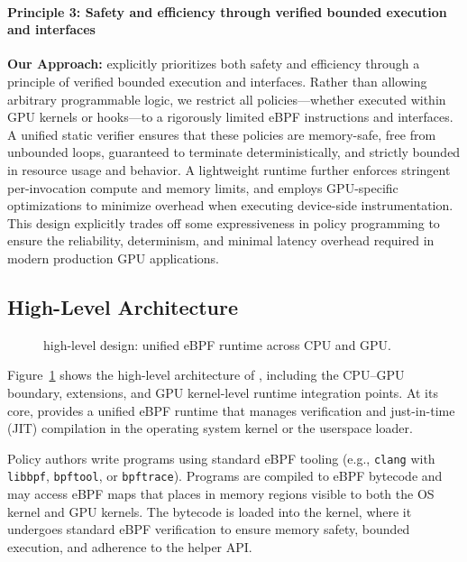 \paragraph{Principle 3: Safety and efficiency through verified bounded execution and interfaces}
\noindent\textbf{Our Approach:} \sys explicitly prioritizes both safety and efficiency through a principle of verified bounded execution and interfaces. Rather than allowing arbitrary programmable logic, we restrict all policies—whether executed within GPU kernels or \sysdriver hooks—to a rigorously limited eBPF instructions and interfaces. A unified static verifier ensures that these policies are memory-safe, free from unbounded loops, guaranteed to terminate deterministically, and strictly bounded in resource usage and behavior. A lightweight runtime further enforces stringent per-invocation compute and memory limits, and employs GPU-specific optimizations to minimize overhead when executing device-side instrumentation. This design explicitly trades off some expressiveness in policy programming to ensure the reliability, determinism, and minimal latency overhead required in modern production GPU applications.

\subsection{High-Level Architecture}
\label{sec:arch}

\begin{figure}
\centering
{}
\vspace{-.5ex}
\caption{\sys high-level design: unified eBPF runtime across CPU and GPU.}
\label{fig:system-design}
\end{figure}

Figure~\ref{fig:system-design} shows the high-level architecture of \sys, including the CPU--GPU boundary, \sysdriver extensions, and GPU kernel-level runtime integration points. At its core, \sys provides a unified eBPF runtime that manages verification and just-in-time (JIT) compilation in the operating system kernel or the userspace loader.

Policy authors write \sys programs using standard eBPF tooling (e.g., \texttt{clang} with \texttt{libbpf}, \texttt{bpftool}, or \texttt{bpftrace}). Programs are compiled to eBPF bytecode and may access eBPF maps that \sys places in memory regions visible to both the OS kernel and GPU kernels. The bytecode is loaded into the kernel, where it undergoes standard eBPF verification to ensure memory safety, bounded execution, and adherence to the helper API.

